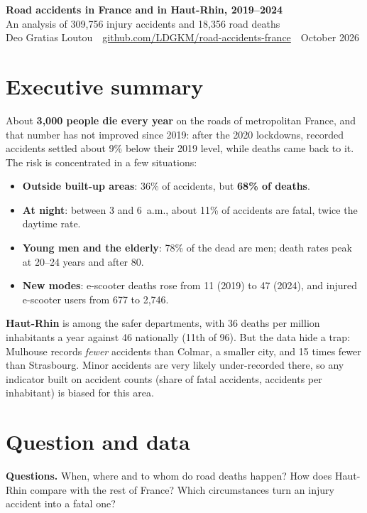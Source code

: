 \documentclass[11pt,a4paper]{article}
\begin{document}
\begin{center}
{\LARGE\bfseries\color{accent} Road accidents in France and in Haut-Rhin, 2019--2024}\\[6pt]
{\large An analysis of 309{,}756 injury accidents and 18{,}356 road deaths}\\[8pt]
Deo Gratias Loutou \,\textbar\, \href{https://github.com/LDGKM/road-accidents-france}{github.com/LDGKM/road-accidents-france} \,\textbar\, October 2026
\end{center}

\section*{Executive summary}
About \textbf{3{,}000 people die every year} on the roads of metropolitan France, and that number has not
improved since 2019: after the 2020 lockdowns, recorded accidents settled about 9\% below their 2019 level,
while deaths came back to it. The risk is concentrated in a few situations:
\begin{itemize}
  \item \textbf{Outside built-up areas}: 36\% of accidents, but \textbf{68\% of deaths}.
  \item \textbf{At night}: between 3 and 6~a.m., about 11\% of accidents are fatal, twice the daytime rate.
  \item \textbf{Young men and the elderly}: 78\% of the dead are men; death rates peak at 20--24 years and after 80.
  \item \textbf{New modes}: e-scooter deaths rose from 11 (2019) to 47 (2024), and injured e-scooter users from 677 to 2{,}746.
\end{itemize}
\textbf{Haut-Rhin} is among the safer departments, with 36 deaths per million inhabitants a year against 46
nationally (11th of 96). But the data hide a trap: Mulhouse records \emph{fewer} accidents than Colmar, a
smaller city, and 15 times fewer than Strasbourg. Minor accidents are very likely under-recorded there, so any
indicator built on accident counts (share of fatal accidents, accidents per inhabitant) is biased for this area.

\section{Question and data}
\textbf{Questions.} When, where and to whom do road deaths happen? How does Haut-Rhin compare with the rest of
France? Which circumstances turn an injury accident into a fatal one?
\end{document}
